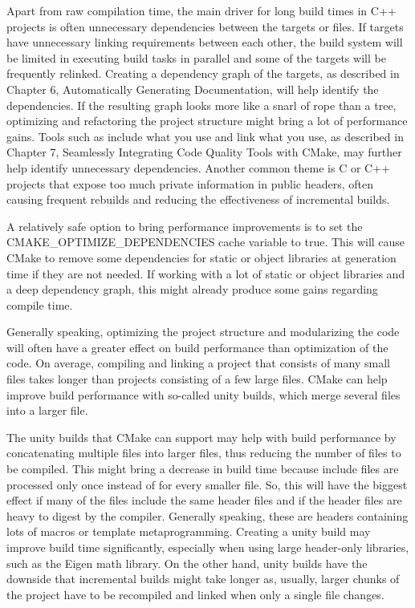
Apart from raw compilation time, the main driver for long build times in C++ projects is often unnecessary dependencies between the targets or files. If targets have unnecessary linking requirements between each other, the build system will be limited in executing build tasks in parallel and some of the targets will be frequently relinked. Creating a dependency graph of the targets, as described in Chapter 6, Automatically Generating Documentation, will help identify the dependencies. If the resulting graph looks more like a snarl of rope than a tree, optimizing and refactoring the project structure might bring a lot of performance gains. Tools such as include what you use and link what you use, as described in Chapter 7, Seamlessly Integrating Code Quality Tools with CMake, may further help identify unnecessary dependencies. Another common theme is C or C++ projects that expose too much private information in public headers, often causing frequent rebuilds and reducing the effectiveness of incremental builds.

A relatively safe option to bring performance improvements is to set the CMAKE\_OPTIMIZE\_DEPENDENCIES cache variable to true. This will cause CMake to remove some dependencies for static or object libraries at generation time if they are not needed. If working with a lot of static or object libraries and a deep dependency graph, this might already produce some gains regarding compile time.

Generally speaking, optimizing the project structure and modularizing the code will often have a greater effect on build performance than optimization of the code. On average, compiling and linking a project that consists of many small files takes longer than projects consisting of a few large files. CMake can help improve build performance with so-called unity builds, which merge several files into a larger file.


The unity builds that CMake can support may help with build performance by concatenating multiple files into larger files, thus reducing the number of files to be compiled. This might bring a decrease in build time because include files are processed only once instead of for every smaller file. So, this will have the biggest effect if many of the files include the same header files and if the header files are heavy to digest by the compiler. Generally speaking, these are headers containing lots of macros or template metaprogramming. Creating a unity build may improve build time significantly, especially when using large header-only libraries, such as the Eigen math library. On the other hand, unity builds have the downside that incremental builds might take longer as, usually, larger chunks of the project have to be recompiled and linked when only a single file changes.

